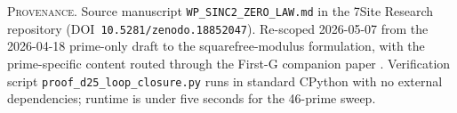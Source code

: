 \documentclass[11pt,reqno]{amsart}
\theoremstyle{plain}
\theoremstyle{remark}
\begin{document}
\vfill
\noindent
\footnotesize{%
\textsc{Provenance.}\; Source manuscript
\texttt{WP\_SINC2\_ZERO\_LAW.md} in the 7Site Research repository
(DOI~\texttt{10.5281/zenodo.18852047}). Re-scoped 2026-05-07 from
the 2026-04-18 prime-only draft to the squarefree-modulus
formulation, with the prime-specific content routed through the
First-G companion paper \cite{J41}. Verification script
\texttt{proof\_d25\_loop\_closure.py} runs in standard CPython with
no external dependencies; runtime is under five seconds for the
46-prime sweep.}
\end{document}
